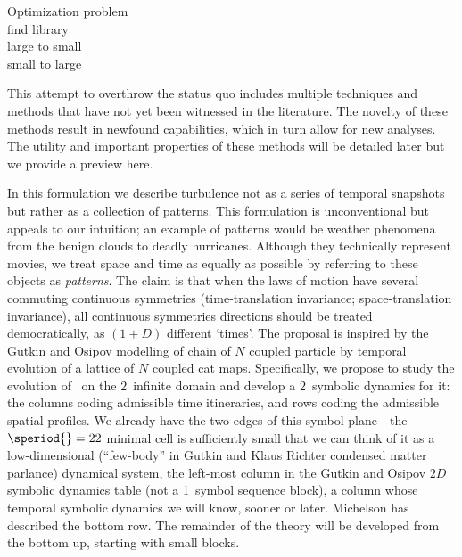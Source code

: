 \begin{itemize}
{\begin{description}
\item[Optimization problem]

\item[find library]
\item[large to small]
\item[small to large]
\end{description}
This attempt to overthrow the status quo includes multiple techniques
and methods that have not yet been witnessed in the literature.
The novelty of these methods result in newfound capabilities, which in turn allow for
new analyses. The utility and important properties of these methods
will be detailed later but we provide a preview here.

In this formulation we describe turbulence not as a series of temporal
snapshots but rather as a collection of {\spt} patterns. This formulation
is unconventional but appeals to our intuition; an example of {\spt} patterns
would be weather phenomena from the benign clouds to deadly hurricanes. Although
they technically represent movies, we treat space and time as equally as possible
by referring to these objects as {\spt} \emph{patterns}.
The claim is that when the laws of motion
have several commuting continuous symmetries (time-translation
invariance; space-translation invariance), all continuous symmetries
directions should be treated democratically, as $(1+D)$ different
`times'. The proposal is inspired by the Gutkin and Osipov 
modelling of chain of $N$ coupled particle by temporal evolution of a
lattice of $N$ coupled cat maps.
Specifically, we propose to study the evolution of \KS\ on the $2$\dmn\ infinite
{\spt}domain and develop a $2$\dmn\ symbolic dynamics for it: the
columns coding admissible time itineraries, and rows coding the
admissible spatial profiles.
We already have the two edges of this symbol plane - the $\speriod{}=22$ minimal
cell is sufficiently small that we can think of it as
a low-dimensional (``few-body'' in Gutkin and Klaus
Richter condensed matter parlance)
dynamical system, the left-most column in the Gutkin and
Osipov $2D$ symbolic dynamics {\spt} table (not a
1\dmn\ symbol sequence block), a column whose temporal symbolic dynamics
we will know, sooner or later. Michelson has described the
bottom row. The remainder of the theory will be developed from the
bottom up, starting with small {\spt} blocks.


}
\end{itemize}
